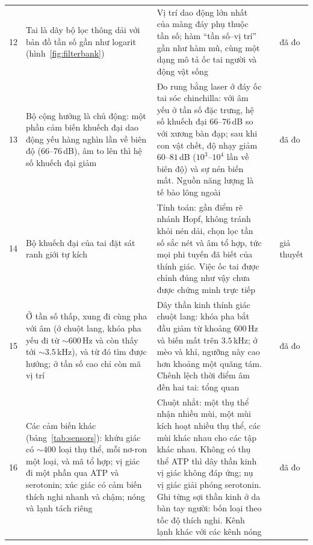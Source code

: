 {\begin{longtable}{>{\raggedright}p{0.5cm}>{\raggedright}p{4.0cm}>{\raggedright}p{5.6cm}>{\raggedright}p{2.3cm}>{\raggedright\arraybackslash}p{1.7cm}}
12 & Tai là dãy bộ lọc thông dải với bản đồ tần số gần như logarit (hình~\ref{fig:filterbank}) & Vị trí dao động lớn nhất của màng đáy phụ thuộc tần số; hàm ``tần số--vị trí'' gần như hàm mũ, cùng một dạng mô tả ốc tai người và động vật sống & \cite{Greenwood1990,Robles2001} & đã đo \\
13 & Bộ cộng hưởng là chủ động: một phần cảm biến khuếch đại dao động yếu hàng nghìn lần về biên độ ($66$--$76$\,dB), âm to lên thì hệ số khuếch đại giảm & Đo rung bằng laser ở đáy ốc tai sóc chinchilla: với âm yếu ở tần số đặc trưng, hệ số khuếch đại $66$--$76$\,dB so với xương bàn đạp; sau khi con vật chết, độ nhạy giảm $60$--$81$\,dB ($10^3$--$10^4$ lần về biên độ) và sự nén biến mất. Nguồn năng lượng là tế bào lông ngoài & \cite{Ruggero1997,Robles2001} & đã đo \\
14 & Bộ khuếch đại của tai đặt sát ranh giới tự kích & Tính toán: gần điểm rẽ nhánh Hopf, không tránh khỏi nén dải, chọn lọc tần số sắc nét và âm tổ hợp, tức mọi phi tuyến đã biết của thính giác. Việc ốc tai được chỉnh đúng như vậy chưa được chứng minh trực tiếp & \cite{Eguiluz2000} & giả thuyết \\
15 & Ở tần số thấp, xung đi cùng pha với âm (ở chuột lang, khóa pha yếu đi từ $\sim600$\,Hz và còn thấy tới $\sim3.5$\,kHz), và từ đó tìm được hướng; ở tần số cao chỉ còn mã vị trí & Dây thần kinh thính giác chuột lang: khóa pha bắt đầu giảm từ khoảng $600$\,Hz và biến mất trên $3.5$\,kHz; ở mèo và khỉ, ngưỡng này cao hơn khoảng một quãng tám. Chênh lệch thời điểm âm đến hai tai: tổng quan & \cite{PalmerRussell1986,Grothe2010} & đã đo \\
16 & Các cảm biến khác (bảng~\ref{tab:sensors}): khứu giác có $\sim400$ loại thụ thể, mỗi nơ-ron một loại, và mã tổ hợp; vị giác đi một phần qua ATP và serotonin; xúc giác có cảm biến thích nghi nhanh và chậm; nóng và lạnh tách riêng & Chuột nhắt: một thụ thể nhận nhiều mùi, một mùi kích hoạt nhiều thụ thể, các mùi khác nhau cho các tập khác nhau. Không có thụ thể ATP thì dây thần kinh vị giác không đáp ứng; nụ vị giác giải phóng serotonin. Ghi từng sợi thần kinh ở da bàn tay người: bốn loại theo tốc độ thích nghi. Kênh lạnh khác với các kênh nóng & \cite{Mombaerts2004,Malnic1999,Finger2005,Huang2005,JohanssonVallbo1979,McKemy2002} & đã đo \\
\bottomrule
\end{longtable}}
